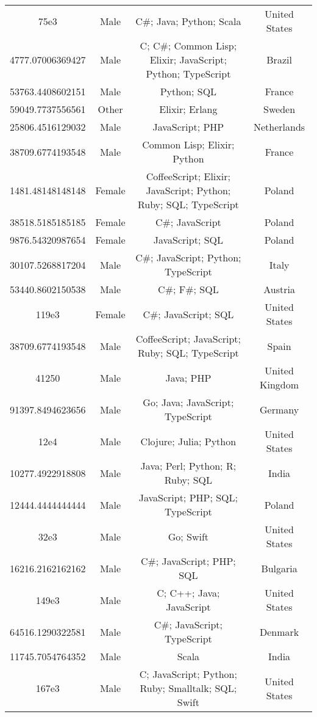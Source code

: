 \begin{center}
\begin{tabular}{ |c|c|c|c| }
75e3  &  Male  &  C\#; Java; Python; Scala  &  United States  \\ 
4777.07006369427  &  Male  &  C; C\#; Common Lisp; Elixir; JavaScript; Python; TypeScript  &  Brazil  \\ 
53763.4408602151  &  Male  &  Python; SQL  &  France  \\ 
59049.7737556561  &  Other  &  Elixir; Erlang  &  Sweden  \\ 
25806.4516129032  &  Male  &  JavaScript; PHP  &  Netherlands  \\ 
38709.6774193548  &  Male  &  Common Lisp; Elixir; Python  &  France  \\ 
1481.48148148148  &  Female  &  CoffeeScript; Elixir; JavaScript; Python; Ruby; SQL; TypeScript  &  Poland  \\ 
38518.5185185185  &  Female  &  C\#; JavaScript  &  Poland  \\ 
9876.54320987654  &  Female  &  JavaScript; SQL  &  Poland  \\ 
30107.5268817204  &  Male  &  C\#; JavaScript; Python; TypeScript  &  Italy  \\ 
53440.8602150538  &  Male  &  C\#; F\#; SQL  &  Austria  \\ 
119e3  &  Female  &  C\#; JavaScript; SQL  &  United States  \\ 
38709.6774193548  &  Male  &  CoffeeScript; JavaScript; Ruby; SQL; TypeScript  &  Spain  \\ 
41250  &  Male  &  Java; PHP  &  United Kingdom  \\ 
91397.8494623656  &  Male  &  Go; Java; JavaScript; TypeScript  &  Germany  \\ 
12e4  &  Male  &  Clojure; Julia; Python  &  United States  \\ 
10277.4922918808  &  Male  &  Java; Perl; Python; R; Ruby; SQL  &  India  \\ 
12444.4444444444  &  Male  &  JavaScript; PHP; SQL; TypeScript  &  Poland  \\ 
32e3  &  Male  &  Go; Swift  &  United States  \\ 
16216.2162162162  &  Male  &  C\#; JavaScript; PHP; SQL  &  Bulgaria  \\ 
149e3  &  Male  &  C; C++; Java; JavaScript  &  United States  \\ 
64516.1290322581  &  Male  &  C\#; JavaScript; TypeScript  &  Denmark  \\ 
11745.7054764352  &  Male  &  Scala  &  India  \\ 
167e3  &  Male  &  C; JavaScript; Python; Ruby; Smalltalk; SQL; Swift  &  United States  \\ 

\end{tabular}
\end{center}
